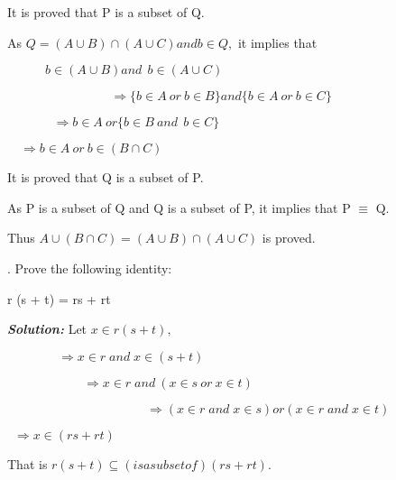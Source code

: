 \documentclass[10pt,a4paper]{book}
\begin{document}
It is proved that P is a subset of Q.

As $Q = (A \cup B) \cap (A \cup C) and b \in Q,$ it implies that
\begin{center}
$\quad \qquad  b \in (A \cup B) and\:\: b \in (A \cup C) $

$\quad\qquad \,\qquad\quad\qquad\Longrightarrow \{b \in A\: or\: b \in B\} and \{b \in A \: or\: b \in C\}$

$\quad\quad\:\quad\:\,\Longrightarrow b \in A\: or \{b \in B \:and \:\:b \in C\}$

$\quad\Longrightarrow b \in A \:or\: b \in (B \cap C)$
\end{center}

It is proved that Q is a subset of P.

As P is a subset of Q and Q is a subset of P, it implies that P $\equiv$ Q.

Thus $A \cup (B \cap C) = (A \cup B) \cap (A \cup C)$ is proved.

\begin{flushleft}
    . Prove the following identity:

  \qquad r (s + t) = rs + rt
\end{flushleft}

\textsl{\textbf{Solution:}} Let $x \in r(s + t),$

\begin{center}

  $\qquad\qquad\Longrightarrow x \in r \;and\; x \in (s + t)$
  
  $\qquad\qquad\quad\quad\Longrightarrow x \in r \;and\: (x \in s \:or\: x \in t)$
  
  $\qquad\qquad\qquad\qquad\qquad\quad\Longrightarrow (x \in r \;and\; x \in s) or (x \in r \;and\; x \in t)$
  
  $\:\;\Longrightarrow x \in (rs + rt)$
  
\end{center}

That is $r(s + t) \subseteq (is a subset of) (rs + rt)$.
\end{document}
